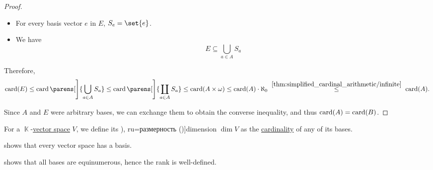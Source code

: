 \begin{proof}
\begin{itemize}
    \item For every basis vector \( e \) in \( E \), \( S_e = \set{ e } \).

    \item We have
    \begin{equation*}
      E \subseteq \bigcup_{a \in A} S_a
    \end{equation*}
  \end{itemize}

  Therefore,
  \begin{equation*}
    \card(E)
    \leq
    \card\parens[\Bigg]{ \bigcup_{a \in A} S_a }
    \leq
    \card\parens[\Bigg]{ \coprod_{a \in A} S_a }
    \leq
    \card(A \times \omega)
    \leq
    \card(A) \cdot \aleph_0
    \reloset {\ref{thm:simplified_cardinal_arithmetic/infinite}} \leq
    \card(A).
  \end{equation*}

  Since \( A \) and \( E \) were arbitrary bases, we can exchange them to obtain the converse inequality, and thus \( \operatorname{card}(A) = \operatorname{card}(B) \).
\end{proof}

\begin{definition}\label{def:vector_space_dimension}\mimprovised
  For a \( \BbbK \)-\hyperref[def:vector_space]{vector space} \( V \), we define its \term[bg=размерност (\cite[216]{Станилов1974АналитичнаГеометрия}), ru=размерность (\cite[sec. 3.7]{Тыртышников2007ЛинейнаяАлгебра})]{dimension} \( \dim V \) as the \hyperref[thm:cardinality_existence]{cardinality} of any of its bases.
\end{definition}
\begin{defproof}
  \item {} shows that every vector space has a basis.
  \item {} shows that all bases are equinumerous, hence the rank is well-defined.
\end{defproof}

